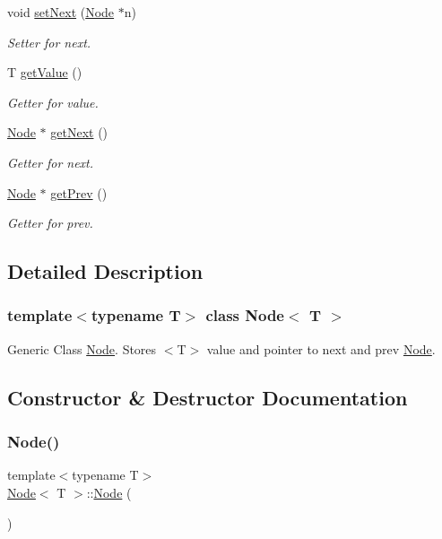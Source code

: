 \begin{DoxyCompactItemize}
void \mbox{\hyperlink{class_node_a1ef90ff513d88f99b7a7c49d916ac6ea}{set\+Next}} (\mbox{\hyperlink{class_node}{Node}} $\ast$n)
\begin{DoxyCompactList}\small\item\em Setter for next. \end{DoxyCompactList}\item 
T \mbox{\hyperlink{class_node_a8a9d6500c263a8338c1b763f44f8dadd}{get\+Value}} ()
\begin{DoxyCompactList}\small\item\em Getter for value. \end{DoxyCompactList}\item 
\mbox{\hyperlink{class_node}{Node}} $\ast$ \mbox{\hyperlink{class_node_aaf2b6c875d0972479da9a26fca47db54}{get\+Next}} ()
\begin{DoxyCompactList}\small\item\em Getter for next. \end{DoxyCompactList}\item 
\mbox{\hyperlink{class_node}{Node}} $\ast$ \mbox{\hyperlink{class_node_ac19243714fdd3b932dfc4de33f87f158}{get\+Prev}} ()
\begin{DoxyCompactList}\small\item\em Getter for prev. \end{DoxyCompactList}\end{DoxyCompactItemize}


\subsection{Detailed Description}
\subsubsection*{template$<$typename T$>$\newline
class Node$<$ T $>$}

Generic Class \mbox{\hyperlink{class_node}{Node}}. Stores $<$\+T$>$ value and pointer to next and prev \mbox{\hyperlink{class_node}{Node}}. 

\subsection{Constructor \& Destructor Documentation}
\mbox{\label{class_node_a0ac1d44cfe588be564acf25485029bd8}} 
\subsubsection{\texorpdfstring{Node()}{Node()}\hspace{0.1cm}{\footnotesize\ttfamily [1/2]}}
{\footnotesize\ttfamily template$<$typename T$>$ \\
\mbox{\hyperlink{class_node}{Node}}$<$ T $>$\+::\mbox{\hyperlink{class_node}{Node}} (\begin{DoxyParamCaption}{ }\end{DoxyParamCaption})\hspace{0.3cm}{\ttfamily [inline]}}



